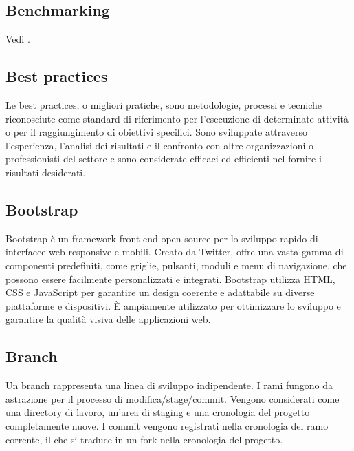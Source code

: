 \vspace{2em}
\subsection*{Benchmarking}
\par Vedi .

\vspace{2em}
\subsection*{Best practices}
\par Le best practices, o migliori pratiche, sono metodologie, processi e tecniche riconosciute come standard di riferimento per l'esecuzione di determinate attività o per il raggiungimento di obiettivi specifici. Sono sviluppate attraverso l'esperienza, l'analisi dei risultati e il confronto con altre organizzazioni o professionisti del settore e sono considerate efficaci ed efficienti nel fornire i risultati desiderati.

\vspace{2em}
\subsection*{Bootstrap}
\par Bootstrap è un framework front-end open-source per lo sviluppo rapido di interfacce web responsive e mobili. Creato da Twitter, offre una vasta gamma di componenti predefiniti, come griglie, pulsanti, moduli e menu di navigazione, che possono essere facilmente personalizzati e integrati. Bootstrap utilizza HTML, CSS e JavaScript per garantire un design coerente e adattabile su diverse piattaforme e dispositivi. È ampiamente utilizzato per ottimizzare lo sviluppo e garantire la qualità visiva delle applicazioni web.

\vspace{2em}
\subsection*{Branch}
\par Un branch rappresenta una linea di sviluppo indipendente. I rami fungono da astrazione per il processo di modifica/stage/commit. Vengono considerati come una directory di lavoro, un'area di staging e una cronologia del progetto completamente nuove. I commit vengono registrati nella cronologia del ramo corrente, il che si traduce in un fork nella cronologia del progetto.

